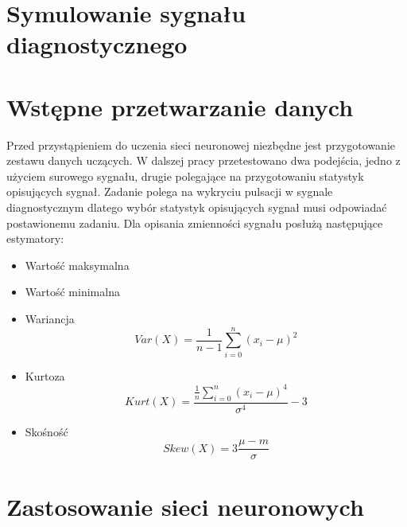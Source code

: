 \documentclass[inzynierska]{pwr_wmat_praca_dyplomowa}
\theoremstyle{plain}
\numberwithin{theorem}{chapter}
\theoremstyle{definition}
\numberwithin{theorem}{chapter}
\begin{document}
\section{Symulowanie sygnału diagnostycznego}
\section{Wstępne przetwarzanie danych}
Przed przystąpieniem do uczenia sieci neuronowej niezbędne jest przygotowanie zestawu danych uczących. W dalszej pracy przetestowano dwa podejścia, jedno z użyciem surowego sygnału, drugie polegające na przygotowaniu statystyk opisujących sygnał. Zadanie polega na wykryciu pulsacji w sygnale diagnostycznym dlatego wybór statystyk opisujących sygnał musi odpowiadać postawionemu zadaniu. Dla opisania zmienności sygnału posłużą następujące estymatory:
\begin{itemize}
	\item Wartość maksymalna
	\item Wartość minimalna
	\item Wariancja
	\begin{equation}
	Var (X) = \frac{1}{n-1} \sum_{i=0}^{n} \left(x_{i} - \mu\right)^{2}
	\end{equation}
	\item Kurtoza
	\begin{equation}
	Kurt (X) = \frac{\frac{1}{n} \sum_{i=0}^{n}\left(x_{i} - \mu\right)^{4}}{\sigma^{4}} - 3
	\end{equation}
	\item Skośność
	\begin{equation}
	Skew (X) = 3 \frac{\mu - m}{\sigma}
	\end{equation}
\end{itemize}



\section{Zastosowanie sieci neuronowych}
\end{document}
